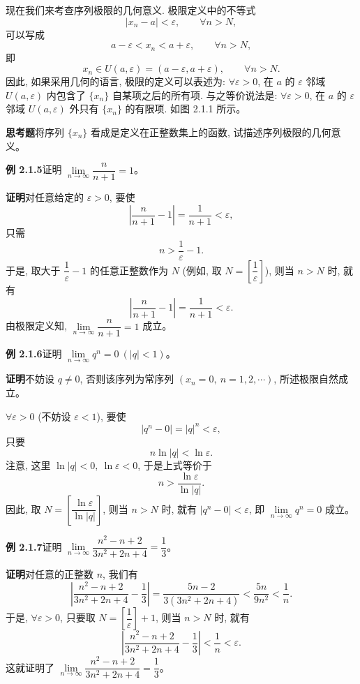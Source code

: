 \documentclass[UTF8,12pt,a4paper,fontset=fandol]{ctexart}
\begin{document}
现在我们来考查序列极限的几何意义. 极限定义中的不等式
\[
  |x_n-a|<\varepsilon,\qquad \forall n>N,
\]
可以写成
\[
  a-\varepsilon<x_n<a+\varepsilon,\qquad \forall n>N,
\]
即
\[
  x_n\in U(a,\varepsilon)=(a-\varepsilon,a+\varepsilon),\qquad \forall n>N.
\]
因此, 如果采用几何的语言, 极限的定义可以表述为: $\forall\varepsilon>0$, 在 $a$ 的 $\varepsilon$ 邻域 $U(a,\varepsilon)$ 内包含了 $\{x_n\}$ 自某项之后的所有项. 与之等价说法是: $\forall\varepsilon>0$, 在 $a$ 的 $\varepsilon$ 邻域 $U(a,\varepsilon)$ 外只有 $\{x_n\}$ 的有限项. 如图 2.1.1 所示。

\noindent\textbf{思考题}\quad 将序列 $\{x_n\}$ 看成是定义在正整数集上的函数, 试描述序列极限的几何意义。

\noindent\textbf{例 2.1.5}\quad 证明 $\lim\limits_{n\to\infty}\dfrac{n}{n+1}=1$。

\noindent\textbf{证明}\quad 对任意给定的 $\varepsilon>0$, 要使
\[
  \left|\frac{n}{n+1}-1\right|
  =
  \frac1{n+1}<\varepsilon,
\]
只需
\[
  n>\frac1\varepsilon-1.
\]
于是, 取大于 $\dfrac1\varepsilon-1$ 的任意正整数作为 $N$ (例如, 取 $N=\left[\dfrac1\varepsilon\right]$), 则当 $n>N$ 时, 就有
\[
  \left|\frac{n}{n+1}-1\right|
  =
  \frac1{n+1}<\varepsilon.
\]
由极限定义知, $\lim\limits_{n\to\infty}\dfrac{n}{n+1}=1$ 成立。

\noindent\textbf{例 2.1.6}\quad 证明 $\lim\limits_{n\to\infty}q^n=0\ (|q|<1)$。

\noindent\textbf{证明}\quad 不妨设 $q\ne0$, 否则该序列为常序列 $(x_n=0,\ n=1,2,\cdots)$, 所述极限自然成立。

$\forall\varepsilon>0$ (不妨设 $\varepsilon<1$), 要使
\[
  |q^n-0|=|q|^n<\varepsilon,
\]
只要
\[
  n\ln |q|<\ln\varepsilon.
\]
注意, 这里 $\ln |q|<0,\ \ln\varepsilon<0$, 于是上式等价于
\[
  n>\frac{\ln\varepsilon}{\ln |q|}.
\]
因此, 取 $N=\left[\dfrac{\ln\varepsilon}{\ln |q|}\right]$, 则当 $n>N$ 时, 就有 $|q^n-0|<\varepsilon$, 即 $\lim\limits_{n\to\infty}q^n=0$ 成立。

\noindent\textbf{例 2.1.7}\quad 证明 $\lim\limits_{n\to\infty}\dfrac{n^2-n+2}{3n^2+2n+4}=\dfrac13$。

\noindent\textbf{证明}\quad 对任意的正整数 $n$, 我们有
\[
  \left|\frac{n^2-n+2}{3n^2+2n+4}-\frac13\right|
  =
  \frac{5n-2}{3(3n^2+2n+4)}
  <
  \frac{5n}{9n^2}
  <
  \frac1n.
\]
于是, $\forall\varepsilon>0$, 只要取 $N=\left[\dfrac1\varepsilon\right]+1$, 则当 $n>N$ 时, 就有
\[
  \left|\frac{n^2-n+2}{3n^2+2n+4}-\frac13\right|
  <
  \frac1n<\varepsilon.
\]
这就证明了 $\lim\limits_{n\to\infty}\dfrac{n^2-n+2}{3n^2+2n+4}=\dfrac13$。
\end{document}
